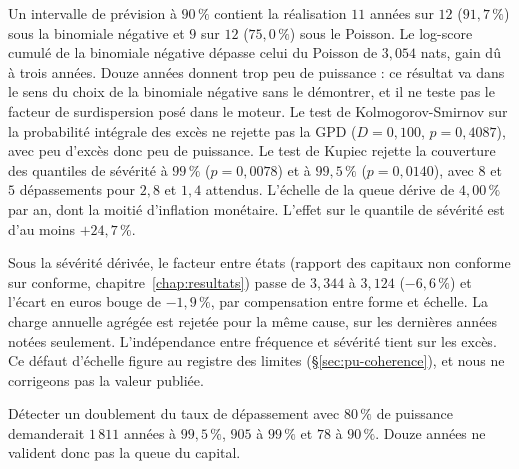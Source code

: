 Un intervalle de prévision à $90\,\%$ contient la réalisation $11$ années sur $12$ ($91{,}7\,\%$)
sous la binomiale négative et $9$ sur $12$ ($75{,}0\,\%$) sous le Poisson. Le log-score cumulé de la binomiale négative dépasse celui du Poisson de $3{,}054$ nats, gain dû à trois années. Douze années donnent trop peu de puissance : ce
résultat va dans le sens du choix de la binomiale négative sans le démontrer, et il ne teste pas
le facteur de surdispersion posé dans le moteur. Le test de Kolmogorov-Smirnov sur la probabilité intégrale
des excès ne rejette pas la GPD ($D=0{,}100$, $p=0{,}4087$), avec peu d'excès donc peu de
puissance. Le test de Kupiec rejette la couverture des quantiles de sévérité à $99\,\%$
($p=0{,}0078$) et à $99{,}5\,\%$ ($p=0{,}0140$), avec $8$ et $5$ dépassements pour $2{,}8$ et
$1{,}4$ attendus. L'échelle de la queue dérive de $4{,}00\,\%$ par an, dont la moitié
d'inflation monétaire. L'effet sur le quantile de sévérité est
d'au moins $+24{,}7\,\%$.

Sous la sévérité dérivée, le facteur entre états (rapport des capitaux non conforme sur conforme, chapitre~\ref{chap:resultats}) passe de
$3{,}344$ à $3{,}124$ ($-6{,}6\,\%$) et l'écart en euros bouge de $-1{,}9\,\%$, par compensation
entre forme et échelle. La charge annuelle agrégée est rejetée pour la même cause, sur les dernières
années notées seulement. L'indépendance entre fréquence et sévérité tient sur les excès. Ce
défaut d'échelle figure au registre des limites (\S\ref{sec:pu-coherence}), et nous ne corrigeons
pas la valeur publiée.

Détecter un doublement du taux de dépassement avec $80\,\%$ de puissance demanderait $1\,811$ années à $99{,}5\,\%$, $905$ à $99\,\%$ et $78$ à $90\,\%$. Douze années ne valident donc pas la queue du capital.
